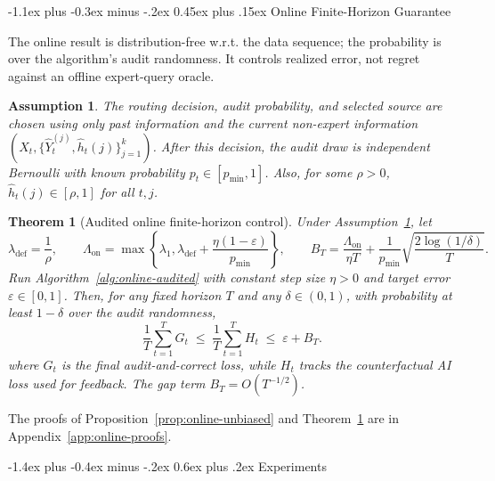 \documentclass[11pt]{article}
\makeatletter
\renewcommand\section{\@startsection{section}{1}{\z@}%
  {-1.4ex plus -0.4ex minus -.2ex}%
  {0.6ex plus .2ex}%
  {\normalfont\Large\bfseries}}
\renewcommand\subsection{\@startsection{subsection}{2}{\z@}%
  {-1.1ex plus -0.3ex minus -.2ex}%
  {0.45ex plus .15ex}%
  {\normalfont\large\bfseries}}
\newtheorem{theorem}{Theorem}
\newtheorem{assumption}{Assumption}
\newcommand{\hatY}{\widehat Y}
\newcommand{\hath}{\widehat h}
\newcommand{\eps}{\varepsilon}
\makeatother
\begin{document}
\subsection{Online Finite-Horizon Guarantee}

The online result is distribution-free w.r.t. the data sequence; the
probability is over the algorithm's audit randomness.
It controls realized error, not regret against an offline expert-query oracle.

\begin{assumption}
\label{ass:online-audits}
The routing decision, audit probability, and selected source are chosen using
only past information and the current non-expert information
$(X_t,\{\hatY_t^{(j)},\hath_t(j)\}_{j=1}^k)$.
After this decision, the audit draw is independent Bernoulli with known
probability $p_t\in[p_{\min},1]$.
Also, for some $\rho>0$, $\hath_t(j)\in[\rho,1]$ for all $t,j$.
\end{assumption}


\begin{theorem}[Audited online finite-horizon control]
\label{thm:online-audited}
Under Assumption~\ref{ass:online-audits}, let
\[
    \lambda_{\mathrm{def}}
    =
    \frac{1}{\rho},
    \qquad
    \Lambda_{\mathrm{on}}
    =
    \max\left\{
        \lambda_1,
        \lambda_{\mathrm{def}}+\frac{\eta(1-\eps)}{p_{\min}}
    \right\},
    \qquad
    B_T
    =
    \frac{\Lambda_{\mathrm{on}}}{\eta T}
    +
    \frac{1}{p_{\min}}\sqrt{\frac{2\log(1/\delta)}{T}}.
\]
Run Algorithm~\ref{alg:online-audited} with constant step size $\eta>0$ and
target error $\eps\in[0,1]$.
Then, for any fixed horizon $T$ and any $\delta\in(0,1)$, with probability at
least $1-\delta$ over the audit randomness,
\begin{equation}
    \frac1T\sum_{t=1}^T G_t
    \;\le\;
    \frac1T\sum_{t=1}^T H_t
    \;\le\;
    \eps + B_T .
    \label{eq:online-H-bound}
\end{equation}
where \(G_t\) is the final audit-and-correct loss, while \(H_t\) tracks the
counterfactual AI loss used for feedback. The gap term \(B_T=O(T^{-1/2})\).
\end{theorem}


The proofs of Proposition~\ref{prop:online-unbiased} and
Theorem~\ref{thm:online-audited} are in
Appendix~\ref{app:online-proofs}.

\section{Experiments}
\label{sec:experiments}
\end{document}
